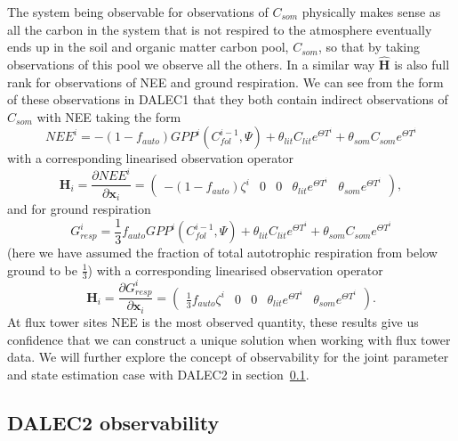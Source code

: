 \documentclass[11pt]{article}
\begin{document}
The system being observable for observations of $C_{som}$ physically makes sense as all the carbon in the system that is not respired to the atmosphere eventually ends up in the soil and organic matter carbon pool, $C_{som}$, so that by taking observations of this pool we observe all the others. In a similar way $\hat{\textbf{H}}$ is also full rank for observations of NEE and ground respiration. We can see from the form of these observations in DALEC1 that they both contain indirect observations of $C_{som}$ with NEE taking the form
\begin{equation}
NEE^{i}=-(1-f_{auto})GPP^{i}(C_{fol}^{i-1}, \Psi) + \theta_{lit}C_{lit} e^{\Theta T^{i}} + \theta_{som}C_{som} e^{\Theta T^{i}} \label{eqn: D1_nee}
\end{equation}
with a corresponding linearised observation operator
\begin{equation}
\textbf{H}_{i} = \frac{\partial NEE^{i}}{\partial \textbf{x}_{i}} =
\begin{pmatrix}
-(1-f_{auto})\zeta^i & 0 & 0 & \theta_{lit} e^{\Theta T^{i}} & \theta_{som} e^{\Theta T^{i}}
\end{pmatrix},
\end{equation}
and for ground respiration
\begin{equation}
G_{resp}^{i}=\frac{1}{3}f_{auto}GPP^{i}(C_{fol}^{i-1}, \Psi) + \theta_{lit}C_{lit} e^{\Theta T^{i}} + \theta_{som}C_{som} e^{\Theta T^{i}} \label{neeeqn}
\end{equation}
(here we have assumed the fraction of total autotrophic respiration from below ground to be $\frac{1}{3}$) with a corresponding linearised observation operator
\begin{equation}
\textbf{H}_{i} = \frac{\partial G_{resp}^{i}}{\partial \textbf{x}_{i}} =
\begin{pmatrix}
\frac{1}{3}f_{auto}\zeta^i & 0 & 0 & \theta_{lit} e^{\Theta T^{i}} & \theta_{som} e^{\Theta T^{i}}
\end{pmatrix}.
\end{equation}
At flux tower sites NEE is the most observed quantity, these results give us confidence that we can construct a unique solution when working with flux tower data. We will further explore the concept of observability for the joint parameter and state estimation case with DALEC2 in section~\ref{sec: D2_observability}. 

\subsection{DALEC2 observability} \label{sec: D2_observability}
\end{document}
